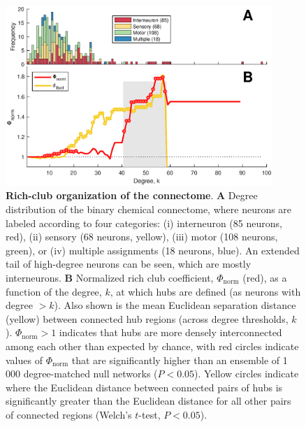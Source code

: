 \documentclass[10pt,letterpaper]{article}
\begin{document}
\begin{figure}[h]
   \centering
    \includegraphics[width=0.9\textwidth]{topology_rich.eps}
 \caption{\textbf{Rich-club organization of the connectome}.
\textbf{A} Degree distribution of the binary chemical connectome, where neurons are labeled according to four categories:
(i) interneuron (85 neurons, red),
(ii) sensory (68 neurons, yellow),
(iii) motor (108 neurons, green), or
(iv) multiple assignments (18 neurons, blue).
An extended tail of high-degree neurons can be seen, which are mostly interneurons.
\textbf{B}
Normalized rich club coefficient, $\Phi_\mathrm{norm}$ (red), as a function of the degree, $k$, at which hubs are defined (as neurons with degree $>k$).
Also shown is the mean Euclidean separation distance (yellow) between connected hub regions (across degree thresholds, $k$).
$\Phi_\mathrm{norm} > 1$ indicates that hubs are more densely interconnected among each other than expected by chance, with red circles indicate values of $\Phi_\mathrm{norm}$ that are significantly higher than an ensemble of 1\,000 degree-matched null networks ($P < 0.05$).
Yellow circles indicate where the Euclidean distance between connected pairs of hubs is significantly greater than the Euclidean distance for all other pairs of connected regions (Welch's $t$-test, $P < 0.05$).
}
 \label{fig:topology_rich}
 \end{figure}
\end{document}

